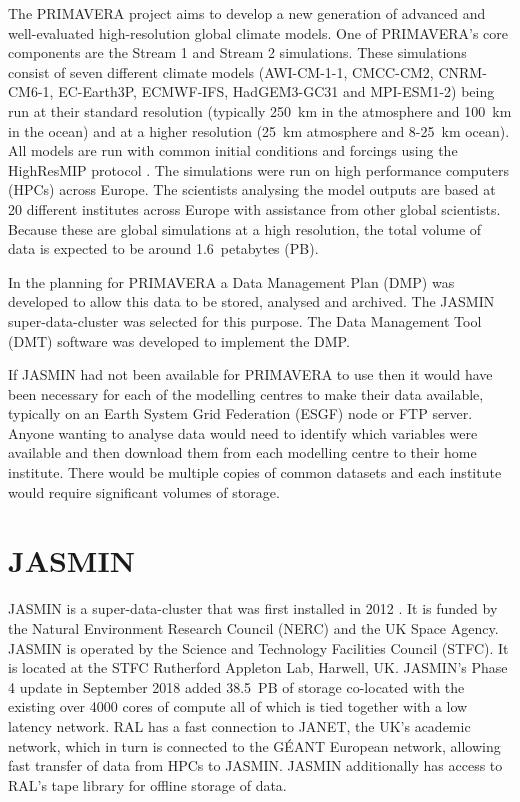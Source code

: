 \documentclass[gmd, manuscript]{copernicus}
\begin{document}


\introduction  %

The PRIMAVERA project aims to develop a new generation of advanced and well-evaluated high-resolution global climate models. One of PRIMAVERA's core components are the Stream 1 and Stream 2 simulations. These simulations consist of seven different climate models (AWI-CM-1-1, CMCC-CM2, CNRM-CM6-1, EC-Earth3P, ECMWF-IFS, HadGEM3-GC31 and MPI-ESM1-2) being run at their standard resolution (typically  250~km in the atmosphere and 100~km in the ocean) and at a higher resolution (25~km atmosphere and 8-25~km ocean). All models are run with common initial conditions and forcings using the HighResMIP protocol \citep{Haarsma2016}. The simulations were run on high performance computers (HPCs) across Europe. The scientists analysing the model outputs are based at 20 different institutes across Europe with assistance from other global scientists. Because these are global simulations at a high resolution, the total volume of data is expected to be around 1.6~petabytes (PB).

In the planning for PRIMAVERA a Data Management Plan (DMP) was developed to allow this data to be stored, analysed and archived. The JASMIN super-data-cluster was selected for this purpose. The Data Management Tool (DMT) software was developed to implement the DMP.

If JASMIN had not been available for PRIMAVERA to use then it would have been necessary for each of the modelling centres to make their data available, typically on an Earth System Grid Federation (ESGF) node or FTP server. Anyone wanting to analyse data would need to identify which variables were available and then download them from each modelling centre to their home institute. There would be multiple copies of common datasets and each institute would require significant volumes of storage.

\section{JASMIN}

JASMIN is a super-data-cluster that was first installed in 2012 \cite{lawrence2013storing}. It is funded by the Natural Environment Research Council (NERC) and the UK Space Agency. JASMIN is operated by the Science and Technology Facilities Council (STFC). It is located at the STFC Rutherford Appleton Lab, Harwell, UK. JASMIN's Phase 4 update in September 2018 added 38.5~PB of storage co-located with the existing over 4000 cores of compute all of which is tied together with a low latency network. RAL has a fast connection to JANET, the UK's academic network, which in turn is connected to the G\'{E}ANT European network, allowing fast transfer of data from HPCs to JASMIN. JASMIN additionally has access to RAL's tape library for offline storage of data.
\end{document}
